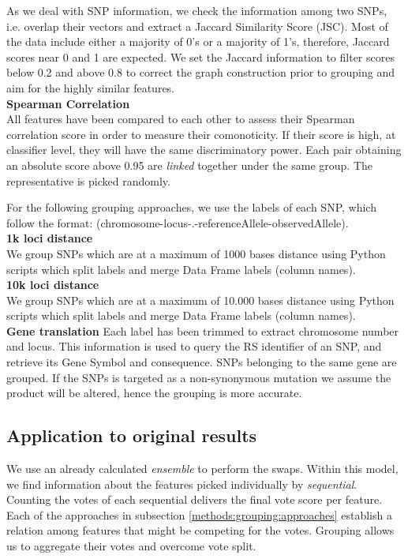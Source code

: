 As we deal with SNP information, we check the information among two SNPs, i.e. overlap their vectors and extract a Jaccard Similarity Score (JSC). Most of the data include either a majority of 0's or a majority of 1's, therefore, Jaccard scores near 0 and 1 are expected. We set the Jaccard information to filter scores below 0.2 and above 0.8 to correct the graph construction prior to grouping and aim for the highly similar features.
\\

\textbf{Spearman Correlation}\\
All features have been compared to each other to assess their Spearman correlation score in order to measure their comonoticity. If their score is high, at classifier level, they will have the same discriminatory power. Each pair obtaining an absolute score above 0.95 are \emph{linked} together under the same group. The representative is picked randomly.

For the following grouping approaches, we use the labels of each SNP, which follow the format: (chromosome-locus-.-referenceAllele-observedAllele).
\\

\textbf{1k loci distance}\\
We group SNPs which are at a maximum of 1000 bases distance using Python scripts which split labels and merge Data Frame labels (column names).
\\

\textbf{10k loci distance}\\
We group SNPs which are at a maximum of 10.000 bases distance using Python scripts which split labels and merge Data Frame labels (column names).
\\

\textbf{Gene translation}
Each label has been trimmed to extract chromosome number and locus. This information is used to query the RS identifier of an SNP, and retrieve its Gene Symbol and consequence. SNPs belonging to the same gene are grouped. If the SNPs is targeted as a non-synonymous mutation we assume the product will be altered, hence the grouping is more accurate.

\subsection{Application to original results}
We use an already calculated \emph{ensemble} to perform the swaps. Within this model, we find information about the features picked individually by \emph{sequential}. Counting the votes of each sequential delivers the final vote score per feature.
\\

Each of the approaches in subsection \ref{methods:grouping:approaches} establish a relation among features that might be competing for the votes. Grouping allows us to aggregate their votes and overcome vote split.